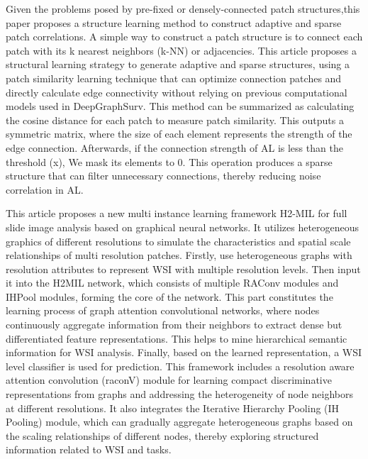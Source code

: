 \documentclass[journal,twoside,web]{ieeecolor}
\begin{document}
Given the problems posed by pre-fixed or densely-connected patch structures,this paper\cite{liu2023graphlsurv} proposes a structure learning method to construct adaptive and sparse patch correlations. A simple way to construct a patch structure is to connect each patch with its k nearest neighbors (k-NN) or adjacencies. This article proposes a structural learning strategy to generate adaptive and sparse structures, using a patch similarity learning technique that can optimize connection patches and directly calculate edge connectivity without relying on previous computational models used in DeepGraphSurv. This method can be summarized as calculating the cosine distance for each patch to measure patch similarity. This outputs a symmetric matrix, where the size of each element represents the strength of the edge connection. Afterwards, if the connection strength of AL is less than the threshold (x), We mask its elements to 0. This operation produces a sparse structure that can filter unnecessary connections, thereby reducing noise correlation in AL.


This article proposes a new multi instance learning framework H2-MIL\cite{hou2022h} for full slide image  analysis based on graphical neural networks. It utilizes heterogeneous graphics of different resolutions to simulate the characteristics and spatial scale relationships of multi resolution patches. Firstly, use heterogeneous graphs with resolution attributes to represent WSI with multiple resolution levels. Then input it into the H2MIL network, which consists of multiple RAConv modules and IHPool modules, forming the core of the network. This part constitutes the learning process of graph attention convolutional networks, where nodes continuously aggregate information from their neighbors to extract dense but differentiated feature representations. This helps to mine hierarchical semantic information for WSI analysis. Finally, based on the learned representation, a WSI level classifier is used for prediction. This framework includes a resolution aware attention convolution (raconV) module for learning compact discriminative representations from graphs and addressing the heterogeneity of node neighbors at different resolutions. It also integrates the Iterative Hierarchy Pooling (IH Pooling) module, which can gradually aggregate heterogeneous graphs based on the scaling relationships of different nodes, thereby exploring structured information related to WSI and tasks.
\end{document}
